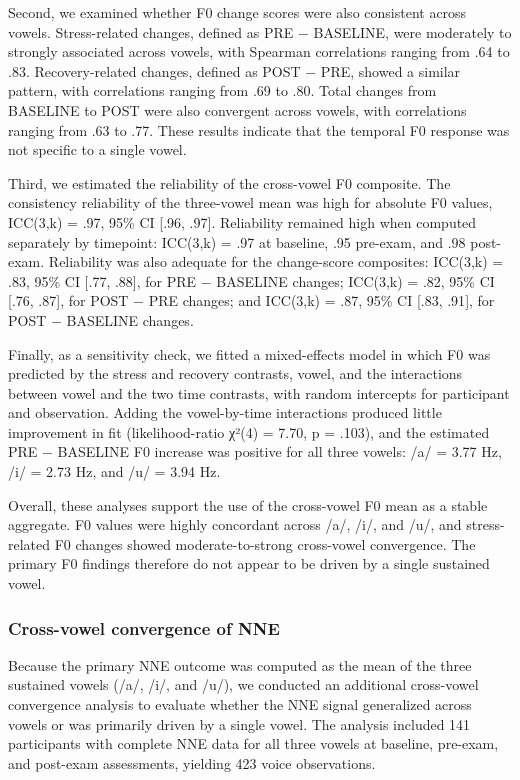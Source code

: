 \documentclass[
  english,
  man,floatsintext]{apa6}
\begin{document}
Second, we examined whether F0 change scores were also consistent across vowels. Stress-related changes, defined as PRE − BASELINE, were moderately to strongly associated across vowels, with Spearman correlations ranging from .64 to .83. Recovery-related changes, defined as POST − PRE, showed a similar pattern, with correlations ranging from .69 to .80. Total changes from BASELINE to POST were also convergent across vowels, with correlations ranging from .63 to .77. These results indicate that the temporal F0 response was not specific to a single vowel.

Third, we estimated the reliability of the cross-vowel F0 composite. The consistency reliability of the three-vowel mean was high for absolute F0 values, ICC(3,k) = .97, 95\% CI {[}.96, .97{]}. Reliability remained high when computed separately by timepoint: ICC(3,k) = .97 at baseline, .95 pre-exam, and .98 post-exam. Reliability was also adequate for the change-score composites: ICC(3,k) = .83, 95\% CI {[}.77, .88{]}, for PRE − BASELINE changes; ICC(3,k) = .82, 95\% CI {[}.76, .87{]}, for POST − PRE changes; and ICC(3,k) = .87, 95\% CI {[}.83, .91{]}, for POST − BASELINE changes.

Finally, as a sensitivity check, we fitted a mixed-effects model in which F0 was predicted by the stress and recovery contrasts, vowel, and the interactions between vowel and the two time contrasts, with random intercepts for participant and observation. Adding the vowel-by-time interactions produced little improvement in fit (likelihood-ratio χ²(4) = 7.70, p = .103), and the estimated PRE − BASELINE F0 increase was positive for all three vowels: /a/ = 3.77 Hz, /i/ = 2.73 Hz, and /u/ = 3.94 Hz.

Overall, these analyses support the use of the cross-vowel F0 mean as a stable aggregate. F0 values were highly concordant across /a/, /i/, and /u/, and stress-related F0 changes showed moderate-to-strong cross-vowel convergence. The primary F0 findings therefore do not appear to be driven by a single sustained vowel.

\subsubsection{Cross-vowel convergence of NNE}\label{cross-vowel-convergence-of-nne}

Because the primary NNE outcome was computed as the mean of the three sustained vowels (/a/, /i/, and /u/), we conducted an additional cross-vowel convergence analysis to evaluate whether the NNE signal generalized across vowels or was primarily driven by a single vowel. The analysis included 141 participants with complete NNE data for all three vowels at baseline, pre-exam, and post-exam assessments, yielding 423 voice observations.
\end{document}
